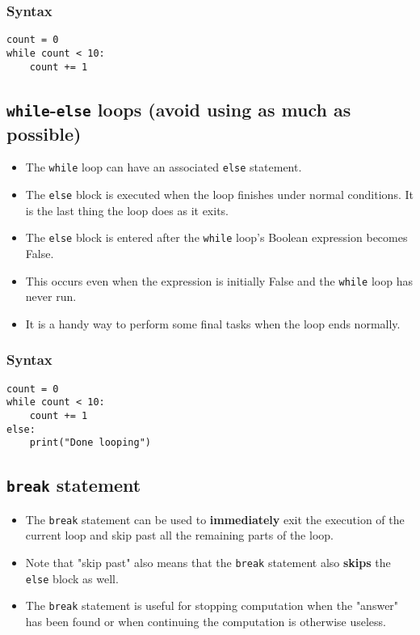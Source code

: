 \documentclass[11pt]{article}
\begin{document}
\subsubsection{Syntax}
\label{sec:org7516a4d}
\begin{verbatim}
count = 0
while count < 10:
    count += 1
\end{verbatim}
\subsection{\texttt{while}-\texttt{else} loops (avoid using as much as possible)}
\label{sec:org923179b}
\begin{itemize}
\item The \texttt{while} loop can have an associated \texttt{else} statement.
\item The \texttt{else} block is executed when the loop finishes under normal conditions. It is the last thing the loop does as it exits.
\item The \texttt{else} block is entered after the \texttt{while} loop's Boolean expression becomes False.
\item This occurs even when the expression is initially False and the \texttt{while} loop has never run.
\item It is a handy way to perform some final tasks when the loop ends normally.
\end{itemize}
\subsubsection{Syntax}
\label{sec:org8fc2139}
\begin{verbatim}
count = 0
while count < 10:
    count += 1
else:
    print("Done looping")
\end{verbatim}
\subsection{\texttt{break} statement}
\label{sec:org71390a7}
\begin{itemize}
\item The \texttt{break} statement can be used to \textbf{immediately} exit the execution of the current loop and skip past all the remaining parts of the loop.
\item Note that "skip past" also means that the \texttt{break} statement also \textbf{skips} the \texttt{else} block as well.
\item The \texttt{break} statement is useful for stopping computation when the "answer" has been found or when continuing the computation is otherwise useless.
\end{itemize}
\end{document}
